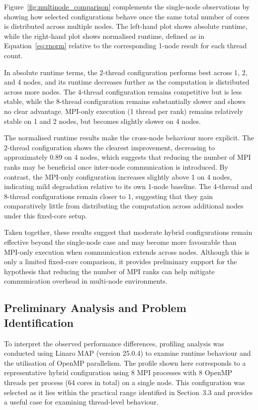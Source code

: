 \documentclass{article}
\begin{document}
Figure~\ref{fig:multinode_comparison} complements the single-node observations by showing how selected configurations behave once the same total number of cores is distributed across multiple nodes. 
The left-hand plot shows absolute runtime, while the right-hand plot shows normalised runtime, defined as in Equation~\ref{eq:rnorm} relative to the corresponding 1-node result for each thread count.

In absolute runtime terms, the 2-thread configuration performs best across 1, 2, and 4 nodes, and its runtime decreases further as the computation is distributed across more nodes. 
The 4-thread configuration remains competitive but is less stable, while the 8-thread configuration remains substantially slower and shows no clear advantage. 
MPI-only execution (1 thread per rank) remains relatively stable on 1 and 2 nodes, but becomes slightly slower on 4 nodes.

The normalised runtime results make the cross-node behaviour more explicit. 
The 2-thread configuration shows the clearest improvement, decreasing to approximately 0.89 on 4 nodes, which suggests that reducing the number of MPI ranks may be beneficial once inter-node communication is introduced. 
By contrast, the MPI-only configuration increases slightly above 1 on 4 nodes, indicating mild degradation relative to its own 1-node baseline. 
The 4-thread and 8-thread configurations remain closer to 1, suggesting that they gain comparatively little from distributing the computation across additional nodes under this fixed-core setup.

Taken together, these results suggest that moderate hybrid configurations remain effective beyond the single-node case and may become more favourable than MPI-only execution when communication extends across nodes. 
Although this is only a limited fixed-core comparison, it provides preliminary support for the hypothesis that reducing the number of MPI ranks can help mitigate communication overhead in multi-node environments.

\subsection{Preliminary Analysis and Problem Identification}

To interpret the observed performance differences, profiling analysis was conducted using Linaro MAP (version 25.0.4) to examine runtime behaviour and the utilisation of OpenMP parallelism. 
The profile shown here corresponds to a representative hybrid configuration using 8 MPI processes with 8 OpenMP threads per process (64 cores in total) on a single node. 
This configuration was selected as it lies within the practical range identified in Section~3.3 and provides a useful case for examining thread-level behaviour.
\end{document}
